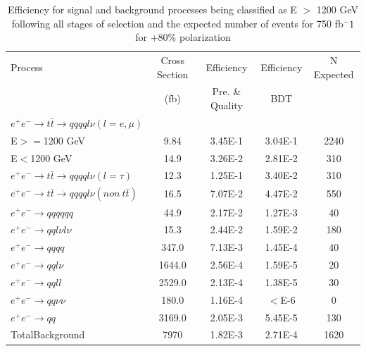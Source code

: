 \begin{table}
  \centering
  \begin{tabular}{l | c | c | c | c}
    \toprule
    Process     & Cross Section & Efficiency & Efficiency & N Expected\\
         & (fb) & Pre. \& Quality & BDT & \\
    \midrule
    $e^+e^-\rightarrow t\bar{t} \rightarrow qqqql\nu (l=e,\mu)$ &  & \\
    E$>=$1200 GeV & 9.84 & 3.45E-1 & 3.04E-1 & 2240\\
    E$<$1200 GeV & 14.9 & 3.26E-2 & 2.81E-2 & 310 \\
   \midrule
    $e^+e^-\rightarrow t\bar{t} \rightarrow qqqql\nu (l=\tau)$& 12.3 & 1.25E-1 & 3.40E-2 & 310\\
    \midrule
    $e^+e^-\rightarrow t\bar{t} \rightarrow qqqql\nu (non ~ t\bar{t})$& 16.5 & 7.07E-2 & 4.47E-2 & 550\\
    \midrule
    $e^+e^-\rightarrow qqqqqq$ & 44.9 & 2.17E-2 & 1.27E-3 & 40 \\
    \midrule
    $e^+e^-\rightarrow qql\nu l\nu$ & 15.3  & 2.44E-2 & 1.59E-2 & 180 \\
    \midrule
    $e^+e^-\rightarrow qqqq$ & 347.0 & 7.13E-3 & 1.45E-4 & 40 \\
    \midrule
    $e^+e^-\rightarrow qql\nu$ & 1644.0 & 2.56E-4 & 1.59E-5 & 20\\
    \midrule
    $e^+e^-\rightarrow qqll$ & 2529.0 & 2.13E-4 & 1.38E-5 & 30 \\
    \midrule
    $e^+e^-\rightarrow qq\nu\nu$ & 180.0 & 1.16E-4 & $<$E-6 & 0 \\
    \midrule
    $e^+e^-\rightarrow qq$ & 3169.0 & 2.05E-3 & 5.45E-5 & 130 \\
    \midrule
    \midrule
    TotalBackground & 7970 & 1.82E-3 & 2.71E-4 & 1620\\
    \bottomrule
  \end{tabular}
  \caption{Efficiency for signal and background processes being classified as E $>$ 1200 GeV following all stages of selection and the expected number of events for 750 fb$^-1$ for +80\% polarization}
  \label{table:topfinalefficienciespos}
\end{table}

